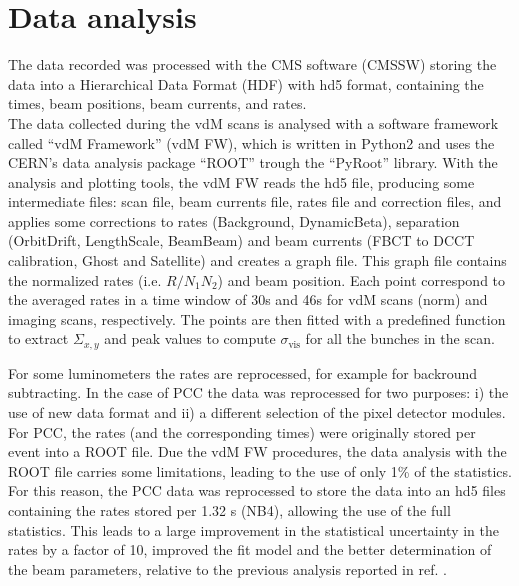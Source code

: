 \section{Data analysis}

The data recorded was processed with the CMS software (CMSSW) storing the data into a Hierarchical Data Format (HDF) with hd5 format, containing the times, beam positions, beam currents, and rates.\\
The data collected during the vdM scans is analysed with a software framework called ``vdM Framework'' (vdM FW), which is written in Python2 and uses the CERN’s data analysis package ``ROOT'' trough the ``PyRoot'' library. With the analysis and plotting tools, the vdM FW reads the hd5 file, producing some intermediate files: scan file, beam currents file, rates file and correction files, and applies some corrections to rates (Background, DynamicBeta), separation (OrbitDrift, LengthScale, BeamBeam) and beam currents (FBCT to DCCT calibration, Ghost and Satellite) and creates a graph file. This graph file contains the normalized rates (i.e. $R/N_{1}N_{2}$) and beam position. Each point correspond to the averaged rates in a time window of 30s and 46s for vdM scans (norm) and imaging scans, respectively. The points are then fitted with a predefined function to extract $\Sigma_{x,y}$ and peak values to compute $\sigma_{\text{vis}}$ for all the bunches in the scan.

For some luminometers the rates are reprocessed, for example for backround subtracting. In the case of PCC the data was reprocessed for two purposes: i) the use of new data format and ii) a different selection of the pixel detector modules.\\
For PCC, the rates (and the corresponding times) were originally stored  per event into a ROOT file. Due the vdM FW procedures, the data analysis with the ROOT file carries some limitations, leading to the  use of only 1\% of the statistics. For this reason, the PCC data was reprocessed  to store the data into an hd5 files containing the rates stored per 1.32 s (NB4), allowing the use of the full statistics. This leads to a large improvement in the statistical uncertainty in the rates by a factor of 10, improved the fit model and the better determination of the beam parameters, relative to the previous analysis reported in ref. \cite{pas_18}.

